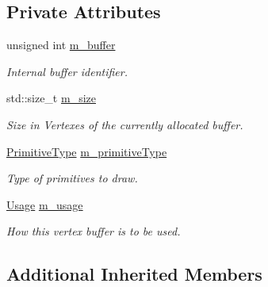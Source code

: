 \subsection*{Private Attributes}
\begin{DoxyCompactItemize}
\item 
\mbox{\label{classsf_1_1_vertex_buffer_aab0082f19be0290bcbaf308379e5d60a}} 
unsigned int \mbox{\hyperlink{classsf_1_1_vertex_buffer_aab0082f19be0290bcbaf308379e5d60a}{m\+\_\+buffer}}
\begin{DoxyCompactList}\small\item\em Internal buffer identifier. \end{DoxyCompactList}\item 
\mbox{\label{classsf_1_1_vertex_buffer_a962780c0687af7aeb1d0555fd1baa445}} 
std\+::size\+\_\+t \mbox{\hyperlink{classsf_1_1_vertex_buffer_a962780c0687af7aeb1d0555fd1baa445}{m\+\_\+size}}
\begin{DoxyCompactList}\small\item\em Size in Vertexes of the currently allocated buffer. \end{DoxyCompactList}\item 
\mbox{\label{classsf_1_1_vertex_buffer_a958cf85fc5426b5b5490a201087046ac}} 
\mbox{\hyperlink{group__graphics_ga5ee56ac1339984909610713096283b1b}{Primitive\+Type}} \mbox{\hyperlink{classsf_1_1_vertex_buffer_a958cf85fc5426b5b5490a201087046ac}{m\+\_\+primitive\+Type}}
\begin{DoxyCompactList}\small\item\em Type of primitives to draw. \end{DoxyCompactList}\item 
\mbox{\label{classsf_1_1_vertex_buffer_ab056efbd5d04372e9054a0e41bd9acfe}} 
\mbox{\hyperlink{classsf_1_1_vertex_buffer_a3a531528684e63ecb45edd51282f5cb7}{Usage}} \mbox{\hyperlink{classsf_1_1_vertex_buffer_ab056efbd5d04372e9054a0e41bd9acfe}{m\+\_\+usage}}
\begin{DoxyCompactList}\small\item\em How this vertex buffer is to be used. \end{DoxyCompactList}\end{DoxyCompactItemize}
\subsection*{Additional Inherited Members}


